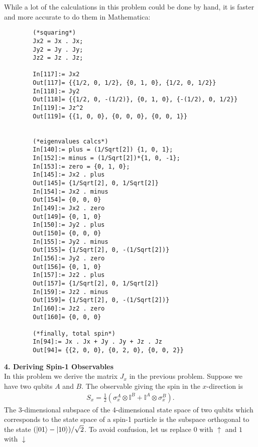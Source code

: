 \documentclass{article}
\theoremstyle{definition}
\newcommand{\f}[2]{\frac{#1}{#2}}
\newcommand{\lp}{\left(}
\newcommand{\rp}{\right)}
\begin{document}
\begin{enumerate}[label=(\alph*)]
	
	
	
	While a lot of the calculations in this problem could be done by hand, it is faster and more accurate to do them in Mathematica:
	\begin{lstlisting}
		(*squaring*)
		Jx2 = Jx . Jx;
		Jy2 = Jy . Jy;
		Jz2 = Jz . Jz;
		
		In[117]:= Jx2
		Out[117]= {{1/2, 0, 1/2}, {0, 1, 0}, {1/2, 0, 1/2}}
		In[118]:= Jy2
		Out[118]= {{1/2, 0, -(1/2)}, {0, 1, 0}, {-(1/2), 0, 1/2}}
		In[119]:= Jz^2
		Out[119]= {{1, 0, 0}, {0, 0, 0}, {0, 0, 1}}
		
		
		(*eigenvalues calcs*)
		In[140]:= plus = (1/Sqrt[2]) {1, 0, 1};
		In[152]:= minus = (1/Sqrt[2])*{1, 0, -1};
		In[153]:= zero = {0, 1, 0};	
		In[145]:= Jx2 . plus
		Out[145]= {1/Sqrt[2], 0, 1/Sqrt[2]}
		In[154]:= Jx2 . minus
		Out[154]= {0, 0, 0}
		In[149]:= Jx2 . zero
		Out[149]= {0, 1, 0}
		In[150]:= Jy2 . plus
		Out[150]= {0, 0, 0}
		In[155]:= Jy2 . minus
		Out[155]= {1/Sqrt[2], 0, -(1/Sqrt[2])}
		In[156]:= Jy2 . zero
		Out[156]= {0, 1, 0}
		In[157]:= Jz2 . plus
		Out[157]= {1/Sqrt[2], 0, 1/Sqrt[2]}
		In[159]:= Jz2 . minus
		Out[159]= {1/Sqrt[2], 0, -(1/Sqrt[2])}
		In[160]:= Jz2 . zero
		Out[160]= {0, 0, 0}
		
		(*finally, total spin*)
		In[94]:= Jx . Jx + Jy . Jy + Jz . Jz
		Out[94]= {{2, 0, 0}, {0, 2, 0}, {0, 0, 2}}
	\end{lstlisting}

\end{enumerate}





\noindent \textbf{4. Deriving Spin-1 Observables}\\

\noindent In this problem we derive the matrix $J_x$ in the previous problem. Suppose we have two qubits $A$ and $B$. The observable giving the spin in the $x$-direction is 
\begin{align*}
	S_x = \f{1}{2}\lp \sigma_x^A\otimes \mathbb{I}^B + \mathbb{I}^A \otimes \sigma_x^B \rp.
\end{align*}
The 3-dimensional subspace of the 4-dimensional state space of two qubits which corresponds to the state space of a spin-1 particle is the subspace orthogonal to the state $(\ket{01}- \ket{10})/\sqrt{2}$. To avoid confusion, let us replace $0$ with $\uparrow$ and $1$ with $\downarrow$\\
\end{document}
